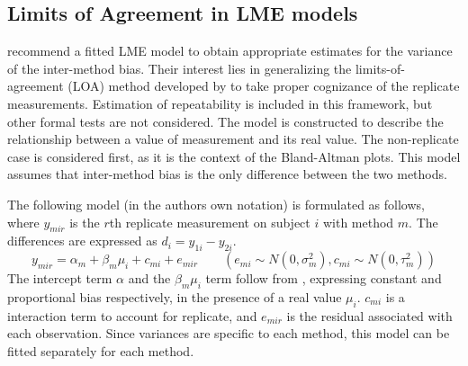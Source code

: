 \documentclass[12pt, a4paper]{report}
\theoremstyle{plain}
\theoremstyle{definition}
\theoremstyle{remark}
\begin{document}
	\subsection{Limits of Agreement in LME models}
%	
	
\citet{BXC2008} recommend a fitted LME model to obtain appropriate estimates for the variance of the inter-method bias. Their interest lies in generalizing the limits-of-agreement (LOA) method developed by \citet{BA86} to take proper cognizance of the replicate measurements.  Estimation of repeatability is included in this framework, but other formal tests are not considered. The model is constructed to describe the relationship between a value of measurement and its real value. The non-replicate case is considered first, as it is the context of the Bland-Altman plots. This model assumes that inter-method bias is the only difference between the two methods.		

	
	The following model (in the authors own notation) is
	formulated as follows, where $y_{mir}$ is the $r$th replicate
	measurement on subject $i$ with method $m$. The differences are expressed as $d_{i} = y_{1i} - y_{2i}$.
	\begin{equation}
	y_{mir}  = \alpha_{m} + \beta_{m}\mu_{i} + c_{mi} + e_{mir} \qquad
	( e_{mi} \sim N(0,\sigma^{2}_{m}), c_{mi} \sim N(0,\tau^{2}_{m}))
	\end{equation}
	The intercept term $\alpha$ and the $\beta_{m}\mu_{i}$ term follow from \citet{DunnSEME}, expressing constant and proportional bias
	respectively, in the presence of a real value $\mu_{i}$. $c_{mi}$ is a interaction term to account for replicate, and $e_{mir}$ is the residual associated with each observation. Since variances are specific to each method, this model can be
	fitted separately for each method.
	
\end{document}
